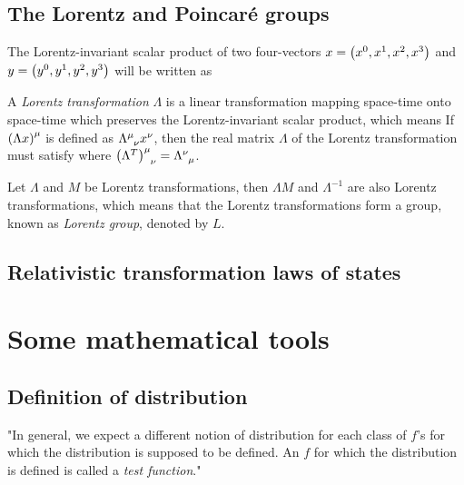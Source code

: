 \documentclass[oneside, 12pt, notitlepage]{book}
\begin{document}
\section{The Lorentz and Poincaré groups}

The Lorentz-invariant scalar product of two four-vectors \(x=\left(x^0,x^1,x^2,x^3\right)\) and \(y = \left(y^0,y^1,y^2,y^3\right)\) will be written as
\par

A \emph{Lorentz transformation} \(\Lambda\) is a linear transformation mapping space-time onto space-time which preserves the Lorentz-invariant scalar product, which means
If \(\left(\Lambda x\right)^{\mu}\) is defined as \(\tensor{\Lambda}{^{\mu}_{\nu}}x^{\nu}\), then the real matrix \(\Lambda\) of the Lorentz transformation must satisfy
where \(\tensor{\lr{\Lambda^T}}{^{\mu}_{\nu}} = \tensor{\Lambda}{^{\nu}_{\mu}}\).\par

Let \(\Lambda\) and \(M\) be Lorentz transformations, then \(\Lambda M\) and \(\Lambda^{-1}\) are also Lorentz transformations, which means that the Lorentz transformations form a group, known as \emph{Lorentz group}, denoted by \(L\).\par

\section{Relativistic transformation laws of states}


\chapter{Some mathematical tools}

\section{Definition of distribution}

"In general, we expect a different notion of distribution for each class of \(f\)'s for which the distribution is supposed to be defined. An \(f\) for which the distribution is defined is called a \emph{test function}."\par
\end{document}
